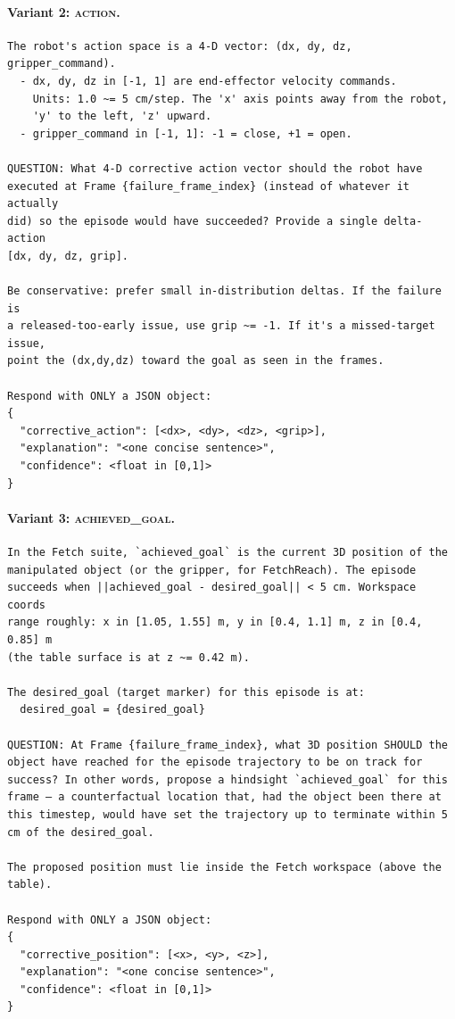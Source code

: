 \paragraph{Variant 2: \textsc{action}.}
{\small
\begin{verbatim}
The robot's action space is a 4-D vector: (dx, dy, dz, gripper_command).
  - dx, dy, dz in [-1, 1] are end-effector velocity commands.
    Units: 1.0 ~= 5 cm/step. The 'x' axis points away from the robot,
    'y' to the left, 'z' upward.
  - gripper_command in [-1, 1]: -1 = close, +1 = open.

QUESTION: What 4-D corrective action vector should the robot have
executed at Frame {failure_frame_index} (instead of whatever it actually
did) so the episode would have succeeded? Provide a single delta-action
[dx, dy, dz, grip].

Be conservative: prefer small in-distribution deltas. If the failure is
a released-too-early issue, use grip ~= -1. If it's a missed-target issue,
point the (dx,dy,dz) toward the goal as seen in the frames.

Respond with ONLY a JSON object:
{
  "corrective_action": [<dx>, <dy>, <dz>, <grip>],
  "explanation": "<one concise sentence>",
  "confidence": <float in [0,1]>
}
\end{verbatim}}

\paragraph{Variant 3: \textsc{achieved\_goal}.}
{\small
\begin{verbatim}
In the Fetch suite, `achieved_goal` is the current 3D position of the
manipulated object (or the gripper, for FetchReach). The episode
succeeds when ||achieved_goal - desired_goal|| < 5 cm. Workspace coords
range roughly: x in [1.05, 1.55] m, y in [0.4, 1.1] m, z in [0.4, 0.85] m
(the table surface is at z ~= 0.42 m).

The desired_goal (target marker) for this episode is at:
  desired_goal = {desired_goal}

QUESTION: At Frame {failure_frame_index}, what 3D position SHOULD the
object have reached for the episode trajectory to be on track for
success? In other words, propose a hindsight `achieved_goal` for this
frame — a counterfactual location that, had the object been there at
this timestep, would have set the trajectory up to terminate within 5
cm of the desired_goal.

The proposed position must lie inside the Fetch workspace (above the
table).

Respond with ONLY a JSON object:
{
  "corrective_position": [<x>, <y>, <z>],
  "explanation": "<one concise sentence>",
  "confidence": <float in [0,1]>
}
\end{verbatim}}

